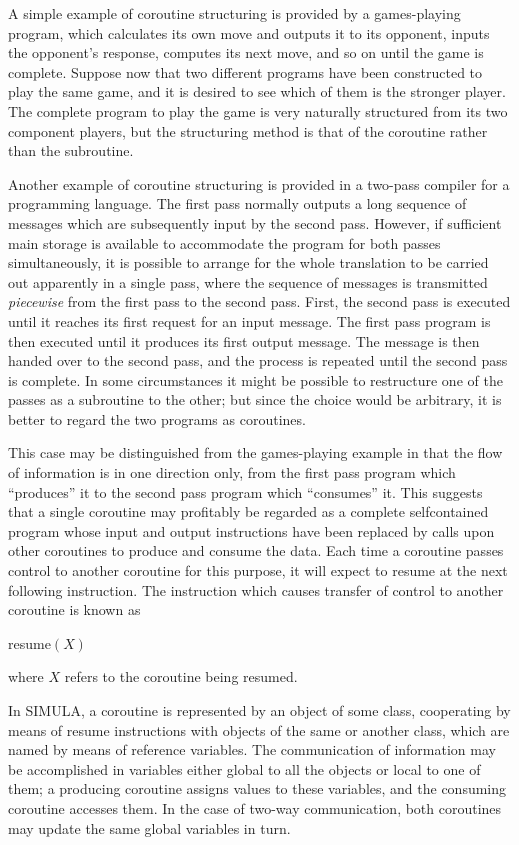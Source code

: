 \documentclass[twoside,11pt]{book}
\begin{document}
A simple example of coroutine structuring is provided by a games-playing program, which calculates its own move and outputs it to its opponent, inputs the opponent's response, computes its next move, and so on until the game is complete. Suppose now that two different programs have been constructed to play the same game, and it is desired to see which of them is the stronger player. The complete program to play the game is very naturally structured from its two component players, but the structuring method is that of the coroutine rather than the subroutine.

Another example of coroutine structuring is provided in a two-pass compiler for a programming language. The first pass normally outputs a long sequence of messages which are subsequently input by the second pass. However, if sufficient main storage is available to accommodate the program for both passes simultaneously, it is possible to arrange for the whole translation to be carried out apparently in a single pass, where the sequence of messages is transmitted \textit{piecewise} from the first pass to the second pass. First, the second pass is executed until it reaches its first request for an input message. The first pass program is then executed until it produces its first output message. The message is then handed over to the second pass, and the process is repeated until the second pass is complete. In some circumstances it might be possible to restructure one of the passes as a subroutine to the other; but since the choice would be arbitrary, it is better to regard the two programs as coroutines.

This case may be distinguished from the games-playing example in that the flow of information is in one direction only, from the first pass program which ``produces'' it to the second pass program which ``consumes'' it. This suggests that a single coroutine may profitably be regarded as a complete selfcontained program whose input and output instructions have been replaced by calls upon other coroutines to produce and consume the data. Each time a coroutine passes control to another coroutine for this purpose, it will expect to resume at the next following instruction. The instruction which causes transfer of control to another coroutine is known as

\quad resume$(X)$

\noindent
where $X$ refers to the coroutine being resumed.

In SIMULA, a coroutine is represented by an object of some class, cooperating by means of resume instructions with objects of the same or another class, which are named by means of reference variables. The communication of information may be accomplished in variables either global to all the objects or local to one of them; a producing coroutine assigns values to these variables, and the consuming coroutine accesses them. In the case of two-way communication, both coroutines may update the same global variables in turn.
\end{document}
